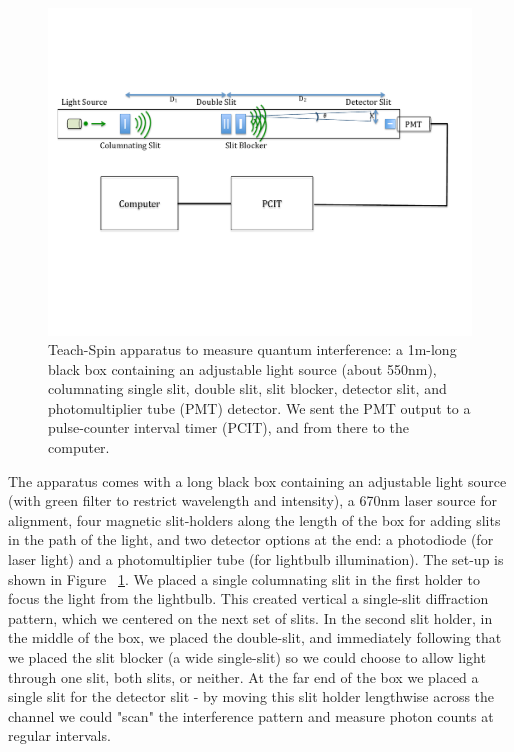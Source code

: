 \documentclass[prb,preprint]{revtex4-1}
\begin{document}
\begin{figure}[h!]
\centering
\includegraphics[width=6in]{set-up.pdf}
\caption{Teach-Spin apparatus to measure quantum interference: a 1m-long black box containing an adjustable light source (about 550nm), columnating single slit, double slit, slit blocker, detector slit, and photomultiplier tube (PMT) detector. We sent the PMT output to a pulse-counter interval timer (PCIT), and from there to the computer. }
\label{set-up}
\end{figure}
The apparatus comes with a long black box containing an adjustable light source (with green filter to restrict wavelength and intensity), a 670nm laser source for alignment, four magnetic slit-holders along the length of the box for adding slits in the path of the light, and two detector options at the end: a photodiode (for laser light) and a photomultiplier tube (for lightbulb illumination).  The set-up is shown in Figure ~\ref{set-up}. We placed a single columnating slit in the first holder to focus the light from the lightbulb. This created vertical a single-slit diffraction pattern, which we centered on the next set of slits.  In the second slit holder, in the middle of the box, we placed the double-slit, and immediately following that we placed the slit blocker (a wide single-slit) so we could choose to allow light through one slit, both slits, or neither.  At the far end of the box we placed a single slit for the detector slit - by moving this slit holder lengthwise across the channel we could "scan" the interference pattern and measure photon counts at regular intervals.  
\end{document}
